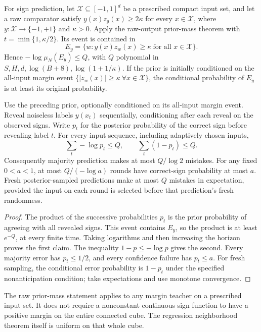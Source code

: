 For sign prediction, let $\mathcal X\subseteq[-1,1]^d$ be a prescribed compact input set, and let a raw comparator satisfy
$y(x)z_g(x)\ge2\kappa$ for every $x\in\mathcal X$, where
$y:\mathcal X\to\{-1,+1\}$ and $\kappa>0$.
Apply the raw-output prior-mass theorem with
$t=\min\{1,\kappa/2\}$. Its event is contained in
\[
 E_y=\{w:y(x)z_w(x)\ge\kappa\ \text{for all }x\in\mathcal X\}.
\]
Hence $-\log\mu_N(E_y)\le Q$, with $Q$ polynomial in
$S,H,d,\log(B+8),\log(1+1/\kappa)$.
If the prior is initially conditioned on the all-input margin event
$\{|z_w(x)|\ge\kappa\ \forall x\in\mathcal X\}$,
the conditional probability of $E_y$ is at least its original probability.

\begin{corollary}\label{cor:online}
Use the preceding prior, optionally conditioned on its all-input margin event. Reveal noiseless labels $y(x_t)$ sequentially, conditioning after each reveal on the observed signs. Write $p_t$ for the posterior probability of the correct sign before revealing label $t$. For every input sequence, including adaptively chosen inputs,
\[
 \sum_t-\log p_t\le Q,\qquad
 \sum_t(1-p_t)\le Q.
\]
Consequently majority prediction makes at most $Q/\log2$ mistakes. For any fixed $0<a<1$, at most $Q/(-\log a)$ rounds have correct-sign probability at most $a$. Fresh posterior-sampled predictions make at most $Q$ mistakes in expectation, provided the input on each round is selected before that prediction's fresh randomness.
\end{corollary}
\begin{proof}
The product of the successive probabilities $p_t$ is the prior probability of agreeing with all revealed signs. This event contains $E_y$, so the product is at least $e^{-Q}$, at every finite time. Taking logarithms and then increasing the horizon proves the first claim. The inequality $1-p\le-\log p$ gives the second. Every majority error has $p_t\le1/2$, and every confidence failure has $p_t\le a$. For fresh sampling, the conditional error probability is $1-p_t$ under the specified nonanticipation condition; take expectations and use monotone convergence.
\end{proof}

The raw prior-mass statement applies to any margin teacher on a prescribed input set. It does not require a nonconstant continuous sign function to have a positive margin on the entire connected cube. The regression neighborhood theorem itself is uniform on that whole cube.
